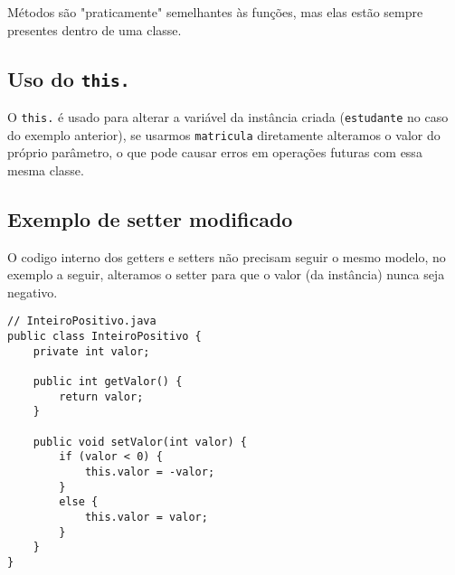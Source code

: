 \documentclass{article}
\begin{document}
\begin{tcolorbox}[colback=yellow!10!white, colframe=yellow!75!black, title=Aviso]
Métodos são "praticamente" semelhantes às funções, mas elas estão sempre presentes dentro de uma classe.
\end{tcolorbox}

\subsection{Uso do \texttt{this.}}
O \texttt{this.} é usado para alterar a variável da instância criada (\texttt{estudante} no caso do exemplo anterior), se usarmos \texttt{matricula} diretamente alteramos o valor do próprio parâmetro, o que pode causar erros em operações futuras com essa mesma classe.

\subsection{Exemplo de setter modificado}
O codigo interno dos getters e setters não precisam seguir o mesmo modelo, no exemplo a seguir, alteramos o setter para que o valor (da instância) nunca seja negativo.
\begin{verbatim}
// InteiroPositivo.java
public class InteiroPositivo {
    private int valor;

    public int getValor() {
        return valor;
    }

    public void setValor(int valor) {
        if (valor < 0) {
            this.valor = -valor;
        }
        else {
            this.valor = valor;
        }
    }
}
\end{verbatim}
\end{document}
